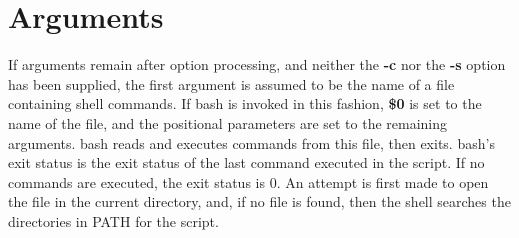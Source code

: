 \section{Arguments}\label{sec:arguments}
If arguments remain after option processing, and neither the \textbf{-c} nor the \textbf{-s} option has been supplied, the first argument is assumed to be the name of a file containing shell commands. If \gls{bash} is invoked in this fashion, \textbf{\$0} is set to the name of the file, and the positional parameters are set to the remaining arguments. \gls{bash} reads and executes commands from this file, then exits. \gls{bash}'s exit status is the exit status of the last command executed in the script. If no commands are executed, the exit status is 0. An attempt is first made to open the file in the current directory, and, if no file is found, then the shell searches the directories in \gls{PATH} for the script.
